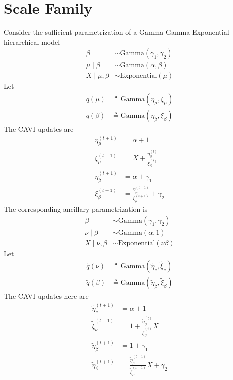 \documentclass{article}
\begin{document}
\newpage



\section{Scale Family}
Consider the sufficient parametrization of a Gamma-Gamma-Exponential hierarchical model
\begin{align}
\beta
&\sim \text{Gamma}(\gamma_1,\gamma_2) \\
\mu\mid \beta
&\sim \text{Gamma}(\alpha,\beta)\\
X\mid \mu,\beta
&\sim \text{Exponential}(\mu)
\end{align}
Let 
\begin{align}
q(\mu)
&\triangleq \text{Gamma}(\eta_\mu, \xi_\mu) \\
q(\beta)
&\triangleq \text{Gamma}(\eta_\beta, \xi_\beta) 
\end{align}
The CAVI updates are 
\begin{align}
\eta_\mu^{(t+1)}
&=\alpha+1 \\
\xi_\mu^{(t+1)}
&=X+\frac{\eta_\beta^{(t)}}{\xi_\beta^{(t)}} \\
\eta_\beta^{(t+1)}
&= \alpha +\gamma_1 \\
\xi_\beta^{(t+1)}
&= \frac{\eta_\mu^{(t+1)}}{\xi_\mu^{(t+1)}} +\gamma_2
\end{align}
The corresponding ancillary parametrization is
\begin{align}
\beta
&\sim \text{Gamma}(\gamma_1,\gamma_2) \\
\nu\mid \beta
&\sim \text{Gamma}(\alpha,1)\\
X\mid \nu,\beta
&\sim \text{Exponential}(\nu\beta)
\end{align}
Let 
\begin{align}
\widetilde q(\nu)
&\triangleq \text{Gamma}(\widetilde \eta_\nu, \widetilde \xi_\nu) \\
\widetilde q(\beta)
&\triangleq \text{Gamma}(\widetilde \eta_\beta, \widetilde \xi_\beta) 
\end{align}
The CAVI updates here are 
\begin{align}
\widetilde \eta_\nu^{(t+1)}
&=\alpha+1 \\
\widetilde \xi_\nu^{(t+1)}
&=1+\frac{\widetilde \eta_\beta^{(t)}}{\widetilde \xi_\beta^{(t)}}X \\
\widetilde \eta_\beta^{(t+1)}
&= 1 +\gamma_1 \\
\widetilde \eta_\beta^{(t+1)}
&= \frac{\widetilde \eta_\mu^{(t+1)}}{\widetilde \xi_\mu^{(t+1)}}X +\gamma_2
\end{align}
\end{document}
